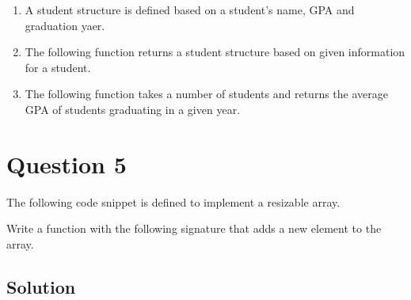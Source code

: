 \documentclass[12pt,letterpaper,twoside]{article}
\begin{document}
\begin{enumerate}

\item A student structure is defined based on a student's name, GPA and graduation yaer.
\lstset{language=c,tabsize=4}


\item The following function returns a student structure based on given information for a student.
\lstset{language=c,tabsize=4}


\item The following function takes a number of students and returns the average GPA of students graduating in a given year.
\lstset{language=c,tabsize=4}


\end{enumerate}

\section*{Question 5}

The following code snippet is defined to implement a resizable array.

\lstset{language=c,tabsize=4}


Write a function with the following signature that adds a new element to the array.



\subsection*{Solution}


\end{document}
